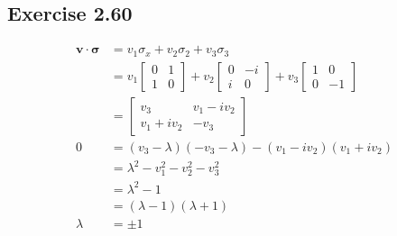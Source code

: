 \documentclass{article}
\renewcommand{\vec}[1]{\boldsymbol{\mathbf{#1}}}
\begin{document}
\subsection*{Exercise 2.60}

\begin{align*}
  \vec{v} \cdot \vec{\sigma} & = v_1 \sigma_x + v_2 \sigma_2 + v_3 \sigma_3                     \\
                             & = v_1 \begin{bmatrix}
                                       0 & 1 \\
                                       1 & 0
                                     \end{bmatrix} + v_2 \begin{bmatrix}
                                                           0 & -i \\
                                                           i & 0
                                                         \end{bmatrix} + v_3 \begin{bmatrix}
                                                                               1 & 0  \\
                                                                               0 & -1
                                                                             \end{bmatrix}     \\
                             & = \begin{bmatrix}
                                   v_3         & v_1 - i v_2 \\
                                   v_1 + i v_2 & -v_3
                                 \end{bmatrix}                                      \\
  0                          & = (v_3 - \lambda) (-v_3 - \lambda) - (v_1 - i v_2) (v_1 + i v_2) \\
                             & = \lambda^2 - v_1^2 - v_2^2 - v_3^2                              \\
                             & = \lambda^2 - 1                                                  \\
                             & = (\lambda - 1) (\lambda + 1)                                    \\
  \lambda                    & = \pm 1                                                          \\
\end{align*}
\end{document}
